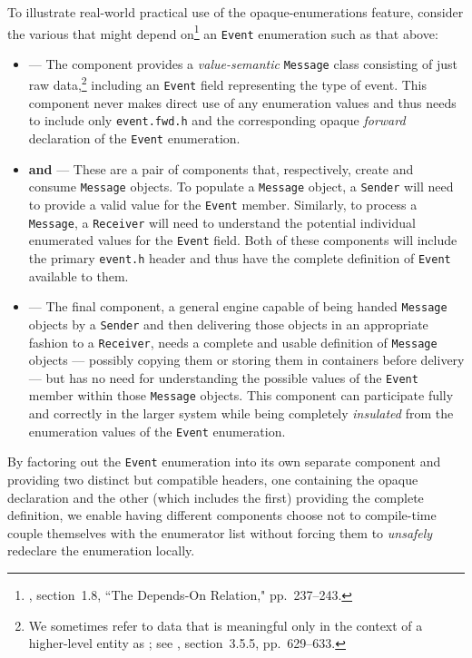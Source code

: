  To illustrate real-world practical use of the opaque-enumerations
feature, consider the various 
  that might depend
on{\cprotect\footnote{\cite{lakos20}, section~1.8, ``The Depends-On Relation," pp.~237--243.}} an \lstinline!Event! enumeration such as that above:
\begin{itemize}
\item{\textbf{} — The component provides a \emph{value-semantic} \lstinline!Message! class consisting of just raw data,\cprotect\footnote{We sometimes refer to data that is meaningful only in the context of a higher-level entity as ; see \cite{lakos20}, section~3.5.5, pp.~629--633.} including an \lstinline!Event! field representing the type of event. This component never makes direct use of any enumeration values and thus needs to include only \lstinline!event.fwd.h! and the corresponding opaque \emph{forward} declaration of the \lstinline!Event! enumeration.}
\item{\textbf{ and } — These are a pair of components that, respectively, create and consume \lstinline!Message! objects. To populate a \lstinline!Message! object, a \lstinline!Sender! will need to provide a valid value for the \lstinline!Event! member. Similarly, to process a \lstinline!Message!, a \lstinline!Receiver! will need to understand the potential individual enumerated values for the \lstinline!Event! field. Both of these components will include the primary \lstinline!event.h! header and thus have the complete definition of \lstinline!Event! available to them.}
\item{\textbf{} — The final component, a general engine capable of being handed \lstinline!Message! objects by a \lstinline!Sender! and then delivering those objects in an appropriate fashion to a \lstinline!Receiver!, needs a complete and usable definition of \lstinline!Message! objects — possibly copying them or storing them in containers before delivery — but has no need for understanding the possible values of the \lstinline!Event! member within those \lstinline!Message! objects. This component can participate fully and correctly in the larger system while being completely \emph{insulated} from the enumeration values of the \lstinline!Event! enumeration.}
\end{itemize}
By factoring out the \lstinline!Event! enumeration into its own
separate component and providing two distinct but compatible headers,
one containing the opaque declaration and the other (which includes the
first) providing the complete definition, we enable having different
components choose not to compile-time couple themselves with the
enumerator list without forcing them to \emph{unsafely} redeclare the
enumeration locally.


